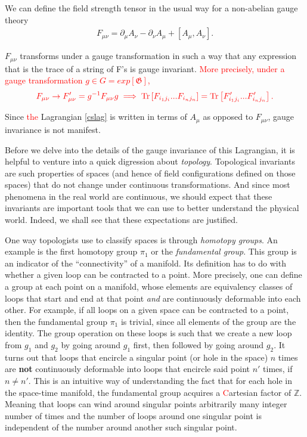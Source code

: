 We can define the field strength tensor in the usual way for a non-abelian gauge theory
\begin{align}
    F_{\mu \nu} = \partial_{\mu}A_{\nu} - \partial_{\nu} A_{\mu} + [A_{\mu}, A_{\nu}].
\end{align}




    $F_{\mu \nu}$ transforms under a gauge transformation in such a way that any expression that is the trace of a string of F's is gauge invariant. \textcolor{red}{More precisely, under a gauge transformation $g\in G=exp\left[\mathfrak{G} \right]$, }
\begin{align}
    \textcolor{red}{F_{\mu \nu} \rightarrow F'_{\mu\nu} = g^{-1} F_{\mu \nu} g \implies \mathrm{Tr}\left[ F_{i_1 j_i} ...F_{i_n j_n} \right]= \mathrm{Tr} \left[F'_{i_1 j_i} ...F'_{i_n j_n} \right].}
\end{align}

    Since \textcolor{red}{the} Lagrangian \textcolor{red}{\eqref{cslag}} is written in terms of $A_{\mu}$ as opposed to $F_{\mu \nu}$, gauge invariance is not manifest.


    Before we delve into the details of the gauge invariance of this Lagrangian, it is helpful to venture into a quick digression about \textit{topology}. Topological invariants are such properties of spaces (and hence of field configurations defined on those spaces) that do not change under continuous transformations. And since most phenomena in the real world are continuous, we should expect that these invariants are important tools that we can use to better understand the physical world. Indeed, we shall see that these expectations are justified. 

    One way topologists use to classify spaces is through \textit{homotopy groups}. An example is the first homotopy group $\pi_1$ or the \textit{fundamental group}. This group is an indicator of the ``connectivity'' of a manifold. Its definition has to do with whether a given loop can be contracted to a point. More precisely, one can define a group at each point on a manifold, whose elements are equivalency classes of loops that start and end at that point \textit{and} are continuously deformable into each other. For example, if all loops on a given space can be contracted to a point, then the fundamental group $\pi_1$ is trivial, since all elements of the group are the identity. The group operation on these loops is such that we create a new loop from $g_1$ and $g_2$ by going around $g_1$ first, then followed by going around $g_2$. It turns out that loops that encircle a singular point (or hole in the space) $n$ times are \textbf{not} continuously deformable into loops that encircle said point $n'$ times, if $n \neq n'$. This is an intuitive way of understanding the fact that for each hole in the space-time manifold, the fundamental group acquires a \textcolor{red}{C}artesian factor of $\mathbb{Z}$. Meaning that loops can wind around singular points arbitrarily many integer number of times and the number of loops around one singular point is independent of the number around another such singular point.

